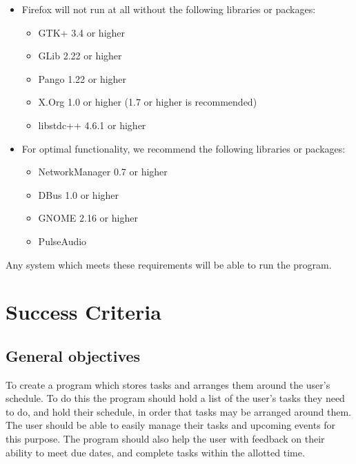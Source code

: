 \documentclass{article}
\begin{document}
\begin{samepage}
	\begin{itemize}
		\item Firefox will not run at all without the following libraries or packages:

		      \begin{samepage}
			      \begin{itemize}
				      \item GTK+ 3.4 or higher
				      \item GLib 2.22 or higher
				      \item Pango 1.22 or higher
				      \item X.Org 1.0 or higher (1.7 or higher is recommended)
				      \item libstdc++ 4.6.1 or higher
			      \end{itemize}
		      \end{samepage}
		\item For optimal functionality, we recommend the following libraries or
		      packages:

		      \begin{samepage}
			      \begin{itemize}
				      \item NetworkManager 0.7 or higher \index{\item}\index{\item}\item DBus 1.0 or
				            higher
				      \item GNOME 2.16 or higher
				      \item PulseAudio
			      \end{itemize}
		      \end{samepage}
	\end{itemize}
\end{samepage}

Any system which meets these requirements will be able to run the program.

\section{Success Criteria}

\subsection{General objectives}
To create a program which stores tasks and arranges them around the user's schedule.
To do this the program should hold a list of the user's tasks they need to do,
and hold their schedule,
in order that tasks may be arranged around them.
The user should be able to easily manage their tasks and upcoming events for this purpose.
The program should also help the user with feedback on their ability to meet due dates,
and complete tasks within the allotted time.
\end{document}
